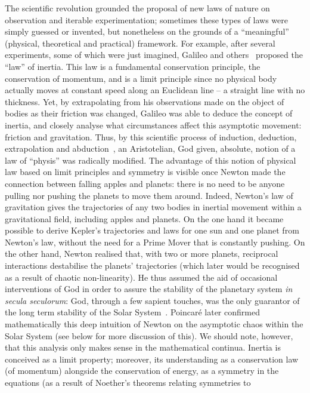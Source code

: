 \documentclass[12pt]{article}
\begin{document}
The scientific revolution grounded the proposal of new laws of nature on observation and iterable experimentation;
sometimes these types of laws were simply
guessed or invented, but nonetheless on the grounds of a ``meaningful'' (physical, theoretical and practical) framework.
For example,
after several experiments, some of which were just imagined,
Galileo and others~\cite{Drake-on-Galilei} proposed the ``law'' of inertia.
This law is a fundamental conservation principle, the conservation of momentum, and is a limit principle since no
physical body actually moves at constant speed along an Euclidean line -- a straight line with no thickness.
Yet, by extrapolating from his observations made on the object of bodies as their friction was changed, Galileo was able to
deduce the concept of inertia, and closely analyse what circumstances affect this asymptotic movement: friction and
gravitation.
Thus, by this scientific process of
induction,
deduction, extrapolation
and abduction~\cite{Peirce-cp,sep-abduction,AbductiveInference},
an Aristotelian, God given, absolute, notion of a law of ``physis'' was radically modified.
The advantage of this notion of physical law based on limit principles and symmetry is visible once Newton made the
connection between falling apples and planets: there is no need to be anyone pulling nor pushing the planets   to move them around.
Indeed, Newton's law of gravitation gives the trajectories of any two bodies in inertial movement within a gravitational
field, including apples and planets.
On the one hand it became possible to derive Kepler's trajectories and laws for one sun and one planet from
Newton's law, without the need for a Prime Mover that is constantly pushing.
On the other hand, Newton realised that, with two or more planets, reciprocal interactions destabilise the planets'
trajectories (which later would be recognised as a result of chaotic non-linearity).
He thus assumed the aid of occasional interventions of God in order to assure the stability of the planetary system
\emph{in secula seculorum}: God, through a few sapient touches, was  the only guarantor of the long term
stability of the Solar System~\cite{laskar1994}.
Poincar\'e later confirmed mathematically this deep intuition of Newton on the asymptotic chaos within the Solar
System (see below for more discussion of this).
We should note, however, that this analysis only makes sense in the mathematical continua.
Inertia is conceived as a limit property; moreover, its understanding as a conservation law (of momentum) alongside the
conservation of energy, as a symmetry in the equations (as a result of Noether's theorems relating symmetries to
\end{document}
